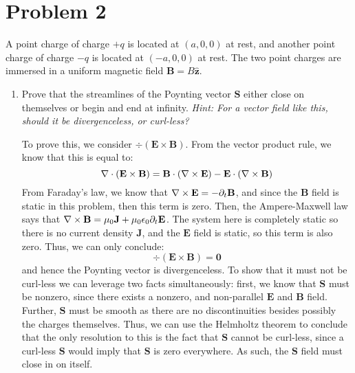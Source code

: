\documentclass[10pt]{article}
\begin{document}
	\section*{Problem 2}
	A point charge of charge \( +q \) is located at \( (a, 0, 0) \) at rest, and another point charge of
	charge \( -q \) is located at \( (-a, 0, 0) \) at rest. The two point charges are immersed in a uniform
	magnetic field \( \mathbf{B} = B \hat{\mathbf{z}} \).
	\begin{enumerate}[label=(\alph*)]
		\item Prove that the streamlines of the Poynting vector \( \mathbf{S} \) either close on themselves
			or begin and end at infinity. \textit{Hint: For a vector field like this, should it be
			divergenceless, or curl-less?}

			\begin{solution}
				To prove this, we consider \( \div (\mathbf{E} \times \mathbf{B}) \). From the vector product
				rule, we know that this is equal to:
				\[
					\nabla \cdot(\mathbf{E} \times \mathbf{B}) = \mathbf{B} \cdot (\nabla \times \mathbf{E}) - \mathbf{E}
					\cdot (\nabla \times \mathbf{B})
				\]
				From Faraday's law, we know that \( \nabla \times \mathbf{E} = -\partial_t \mathbf{B} \), and since
				the \( \mathbf{B} \) field is static in this problem, then this term is zero. Then, the
				Ampere-Maxwell law says that \( \nabla \times \mathbf{B} = \mu_0 \mathbf{J} + \mu_0 \epsilon_0
				\partial_t \mathbf{E} \). The system here is completely static so there is no current density
				\( \mathbf{J} \), and the \( \mathbf{E} \) field is static, so this term is also zero. Thus, 
				we can only conclude:
				\[
					\div(\mathbf{E} \times \mathbf{B}) = \mathbf{0}
				\]
				and hence the Poynting vector is divergenceless. To show that it must not be curl-less we can
				leverage two facts simultaneously: first, we know that \( \mathbf{S} \) must be nonzero,
				since there exists a nonzero, and non-parallel \( \mathbf{E} \) and \( \mathbf{B} \) field.
				Further, \( \mathbf{S} \) must be smooth as there are no discontinuities besides possibly the
				charges themselves. Thus, we can use the Helmholtz theorem to conclude that the only
				resolution to this is the fact that \( \mathbf{S} \) cannot be curl-less, since a curl-less
				\( \mathbf{S} \) would imply that \( \mathbf{S} \) is zero everywhere. As such, the \(
				\mathbf{S} \) field must close in on itself. 


\end{solution}
\end{enumerate}
\end{document}
